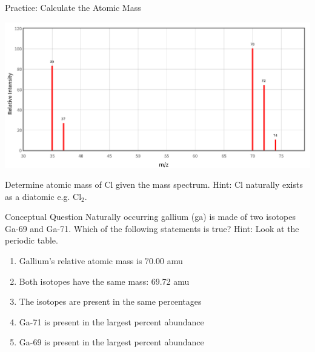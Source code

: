 \documentclass[11pt]{beamer}
\begin{document}
\begin{frame}{Practice: Calculate the Atomic Mass}
  \begin{center}
    \includegraphics[scale=0.175]{cl_mass_spec}
  \end{center}
  Determine atomic mass of Cl given the mass spectrum. Hint:
  Cl naturally exists as a diatomic e.g. Cl$_2$.
\end{frame}

\begin{frame}{Conceptual Question}
  Naturally occurring gallium (ga) is made of two isotopes
  Ga-69 and Ga-71. Which of the following statements is true?
  Hint: Look at the periodic table.
  
  \begin{enumerate}
  \item Gallium's relative atomic mass is 70.00 amu
  \item Both isotopes have the same mass: 69.72 amu
  \item The isotopes are present in the same percentages
  \item Ga-71 is present in the largest percent abundance
  \item Ga-69 is present in the largest percent abundance
  \end{enumerate}
\end{frame}
\end{document}
